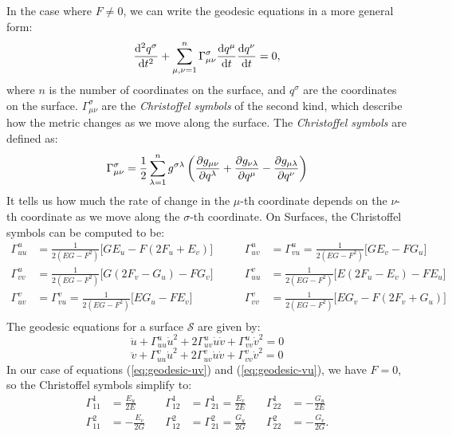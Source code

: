 \documentclass[12pt]{article}
\begin{document}
In the case where $F \neq 0$, we can write the geodesic equations in a more general form:
\begin{equation}\label{eq:geodesic-compact}
	\dv[2]{q^\sigma}{t} + \sum_{\mu,\nu=1}^{n} \Gamma_{\mu\nu}^\sigma \dv{q^\mu}{t} \dv{q^\nu}{t} = 0,
\end{equation}
where $n$ is the number of coordinates on the surface, and $q^\sigma$ are the coordinates on the surface.
$\Gamma_{\mu\nu}^\sigma$ are the \emph{Christoffel symbols} of the second kind, which describe how the metric changes as we move along the surface.
The \emph{Christoffel symbols} are defined as:
\[
	\Gamma_{\mu\nu}^\sigma = \frac{1}{2}\sum_{\lambda=1}^{n}g^{\sigma\lambda}\left(\pdv{g_{\mu\nu}}{q^\lambda} + \pdv{g_{\nu\lambda}}{q^\mu} - \pdv{g_{\mu\lambda}}{q^\nu}\right)
\]
It tells us how much the rate of change in the $\mu$-th coordinate depends on the $\nu$-th coordinate as we move along the $\sigma$-th coordinate.
On Surfaces, the Christoffel symbols can be computed to be:
\[
\begin{aligned}
	\Gamma_{uu}^{u} &= \frac{1}{2(EG - F^{2})}\bigg[ G E_{u} - F (2F_{u} + E_{v}) \bigg] &\qquad \Gamma_{uv}^{u} &= \Gamma_{vu}^{u} = \frac{1}{2(EG - F^{2})}\bigg[ G E_{v} - F G_{u} \bigg] \\
	\Gamma_{vv}^{u} &= \frac{1}{2(EG - F^{2})}\bigg[ G (2F_{v} - G_{u}) - F G_{v} \bigg] &\qquad \Gamma_{uu}^{v} &= \frac{1}{2(EG - F^{2})}\bigg[ E (2F_{u} - E_{v}) - F E_{u} \bigg] \\
	\Gamma_{uv}^{v} &= \Gamma_{vu}^{v} = \frac{1}{2(EG - F^{2})}\bigg[ E G_{u} - F E_{v} \bigg] &\qquad \Gamma_{vv}^{v} &= \frac{1}{2(EG - F^{2})}\bigg[ E G_{v} - F (2F_{v} + G_{u}) \bigg] \\
\end{aligned}
\]
The geodesic equations for a surface $\mathcal{S}$ are given by:
\[
	\ddot{u} + \Gamma_{uu}^{u}\dot{u}^{2} + 2\Gamma_{uv}^{u}\dot{u}\dot{v} + \Gamma_{vv}^{u}\dot{v}^{2} = 0
\]
\[
	\ddot{v} + \Gamma_{uu}^{v}\dot{u}^{2} + 2\Gamma_{uv}^{v}\dot{u}\dot{v} + \Gamma_{vv}^{v}\dot{v}^{2} = 0
\]
In our case of equations (\ref{eq:geodesic-uv}) and (\ref{eq:geodesic-vu}), we have $F = 0$, so the Christoffel symbols simplify to:
\[
\begin{aligned}
    \Gamma_{11}^{1} &= \frac{E_{u}}{2E} &\quad \Gamma_{12}^{1} &= \Gamma_{21}^{1} = \frac{E_{v}}{2E} &\quad \Gamma_{22}^{1} &= -\frac{G_{u}}{2E} \\[4mm]
    \Gamma_{11}^{2} &= -\frac{E_{v}}{2G} &\quad \Gamma_{12}^{2} &= \Gamma_{21}^{2} = \frac{G_{u}}{2G} &\quad \Gamma_{22}^{2} &= -\frac{G_{v}}{2G}.
\end{aligned}
\]
\end{document}
